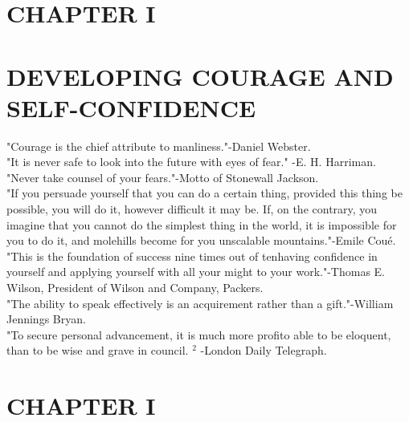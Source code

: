 \documentclass[10pt]{article}
\begin{document}
\section*{CHAPTER I}
\section*{DEVELOPING COURAGE AND SELF-CONFIDENCE}
"Courage is the chief attribute to manliness."-Daniel Webster.\\
"It is never safe to look into the future with eyes of fear." -E. H. Harriman.\\
"Never take counsel of your fears."-Motto of Stonewall Jackson.\\
"If you persuade yourself that you can do a certain thing, provided this thing be possible, you will do it, however difficult it may be. If, on the contrary, you imagine that you cannot do the simplest thing in the world, it is impossible for you to do it, and molehills become for you unscalable mountains."-Emile Coué.\\
"This is the foundation of success nine times out of tenhaving confidence in yourself and applying yourself with all your might to your work."-Thomas E. Wilson, President of Wilson and Company, Packers.\\
"The ability to speak effectively is an acquirement rather than a gift."-William Jennings Bryan.\\
"To secure personal advancement, it is much more profito able to be eloquent, than to be wise and grave in council. ${ }^{2}$ -London Daily Telegraph.

\section*{CHAPTER I}
\end{document}
